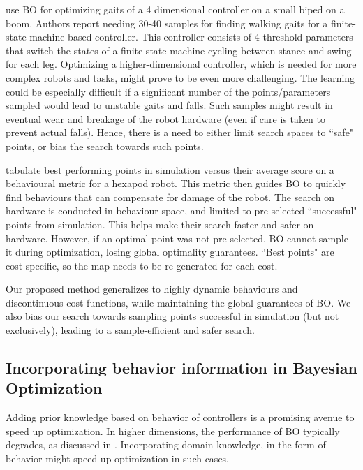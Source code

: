 \cite{calandra2016bayesian} use BO for optimizing gaits of a 4 dimensional controller on a small biped on a boom. Authors report needing 30-40 samples for finding walking gaits for a finite-state-machine based controller. This controller consists of 4 threshold parameters that switch the states of a finite-state-machine cycling between stance and swing for each leg. Optimizing a higher-dimensional controller, which is needed for more complex robots and tasks, might prove to be even more challenging. The learning could be especially difficult if a significant number of the points/parameters sampled would lead to unstable gaits and falls. Such samples might result in eventual wear and breakage of the robot hardware (even if care is taken to prevent actual falls). Hence, there is a need to either limit search spaces to ``safe" points, or bias the search towards such points. 

\cite{cully2015robots} tabulate best performing points in simulation versus their average score on a behavioural metric for a hexapod robot. This metric then guides BO to quickly find behaviours that can compensate for damage of the robot. The search on hardware is conducted in behaviour space, and limited to pre-selected ``successful" points from simulation.  This helps make their search faster and safer on hardware.   However, if an optimal point was not pre-selected,  BO cannot sample it during optimization, losing global optimality guarantees.  ``Best points" are cost-specific, so the map needs to be re-generated for each cost.

Our proposed method generalizes to highly dynamic behaviours and discontinuous cost functions, while maintaining the global guarantees of BO. We also bias our search towards sampling points successful in simulation (but not exclusively), leading to a sample-efficient and safer search.

\subsection{Incorporating behavior information in Bayesian Optimization}

Adding prior knowledge based on behavior of controllers is a promising avenue to speed up optimization. In higher dimensions, the performance of BO typically degrades, as discussed in \cite{localBO17}. Incorporating domain knowledge, in the form of behavior might speed up optimization in such cases.


